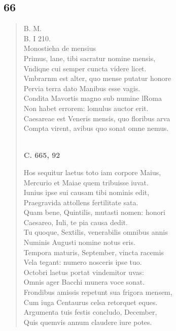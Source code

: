 \documentclass[11pt, a4paper]{report}
\begin{document}
            \subsection*{66}
      \begin{verse}
      B. M. \\ B. I 210. \\ Monostieha de mensius \\ Primus, lane, tibi sacratur nomine mensis, \\ Vndiqne cui semper cuncta videre licet. \\ Vmbrarnm est alter, quo mense putatur honore \\ Pervia terra dato Manibus esse vagis. \\ Condita Mavortis magno sub numine lRoma \\ Non habet errorem: lomulus auctor erit. \\ Caesareae est Veneris mensis, quo floribus arva \\ Compta virent, avibus quo sonat omne nemus. \\ 
        ﻿\pagebreak 
     \marginpar{[136]} \begin{center} \textbf{C. 665, 92} \end{center}Hos sequitur laetus toto iam corpore Maius, \\ Mercurio et Maiae quem tribuisse iuvat. \\ Iunius ipse sui causam tibi nominis edit, \\ Praegravida attollens fertilitate sata. \\ Quam bene, Quintilis, mutasti nomen: honori \\ Caesareo, Iuli, te pia causa dedit. \\ Tu quoque, Sextilis, venerabilis omnibus annis \\ Numinis Augusti nomine notus eris. \\ Tempora maturis, September, vincta racemis \\ Vela tegant: numero nosceris ipse tuo. \\ Octobri laetus portat vindemitor uvas: \\ Omnis ager Bacchi munera voce sonat. \\ Frondibus amissis repetunt sua frigora mensem, \\ Cum iuga Centaurus celsa retorquet eques. \\ Argumenta tuis festis concludo, December, \\ Quis quemvis annum claudere  \lbrack iure potes. \\ 

\end{verse}
\end{document}
